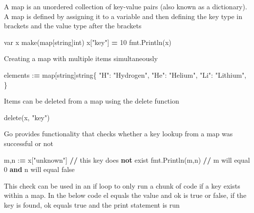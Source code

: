 \documentclass[]{book}
\newenvironment{Shaded}{\begin{snugshade}}{\end{snugshade}}
\newcommand{\BuiltInTok}[1]{#1}
\newcommand{\DecValTok}[1]{\textcolor[rgb]{0.00,0.00,0.81}{#1}}
\newcommand{\KeywordTok}[1]{\textcolor[rgb]{0.13,0.29,0.53}{\textbf{#1}}}
\newcommand{\NormalTok}[1]{#1}
\newcommand{\OperatorTok}[1]{\textcolor[rgb]{0.81,0.36,0.00}{\textbf{#1}}}
\newcommand{\StringTok}[1]{\textcolor[rgb]{0.31,0.60,0.02}{#1}}
\begin{document}
A map is an unordered collection of key-value pairs (also known as a dictionary). A map is defined by assigning it to a variable and then defining the key type in brackets and the value type after the brackets

\begin{Shaded}
\begin{Highlighting}[]
\NormalTok{var x make(}\BuiltInTok{map}\NormalTok{[string]}\BuiltInTok{int}\NormalTok{)}
\NormalTok{x[}\StringTok{"key"}\NormalTok{] }\OperatorTok{=} \DecValTok{10} 
\NormalTok{fmt.Println(x)}
\end{Highlighting}
\end{Shaded}

Creating a map with multiple items simultaneously

\begin{Shaded}
\begin{Highlighting}[]
\NormalTok{elements :}\OperatorTok{=} \BuiltInTok{map}\NormalTok{[string]string\{}
  \StringTok{"H"}\NormalTok{:  }\StringTok{"Hydrogen"}\NormalTok{,}
  \StringTok{"He"}\NormalTok{: }\StringTok{"Helium"}\NormalTok{,}
  \StringTok{"Li"}\NormalTok{: }\StringTok{"Lithium"}\NormalTok{,}
\NormalTok{\}}
\end{Highlighting}
\end{Shaded}

Items can be deleted from a map using the delete function

\begin{Shaded}
\begin{Highlighting}[]
\NormalTok{delete(x, }\StringTok{"key"}\NormalTok{)}
\end{Highlighting}
\end{Shaded}

Go provides functionality that checks whether a key lookup from a map was successful or not

\begin{Shaded}
\begin{Highlighting}[]
\NormalTok{m,n :}\OperatorTok{=}\NormalTok{ x[}\StringTok{"unknown"}\NormalTok{] }\OperatorTok{//}\NormalTok{ this key does }\KeywordTok{not}\NormalTok{ exist}
\NormalTok{fmt.Println(m,n) }\OperatorTok{//}\NormalTok{ m will equal }\DecValTok{0} \KeywordTok{and}\NormalTok{ n will equal false}
\end{Highlighting}
\end{Shaded}

This check can be used in an if loop to only run a chunk of code if a key exists within a map. In the below code el equals the value and ok is true or false, if the key is found, ok equals true and the print statement is run
\end{document}
